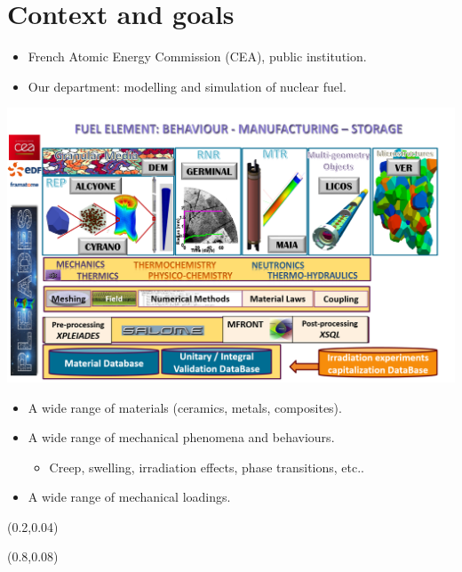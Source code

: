 \documentclass{beamer}
\begin{document}
\PageTitre{}

\begin{frame}[fragile]
  \begin{flushleft}
    {\tiny
      \tableofcontents[hideallsubsections]
    }
  \end{flushleft}
\end{frame}

\section{Context and goals}

\begin{frame}[fragile]
  \begin{itemize}
    \item French Atomic Energy Commission (CEA), public institution.
    \item Our department: modelling and simulation of nuclear fuel.
  \end{itemize}
  \begin{center}
    \includegraphics[trim = .2cm .2cm .2cm .6cm,clip,width=0.50\linewidth]{img/PLEIADES_2019_en.png}
  \end{center}
  \begin{itemize}
    \item A wide range of materials (ceramics, metals, composites).
    \item A wide range of mechanical phenomena and behaviours.
    \begin{itemize}
      \item Creep, swelling, irradiation effects, phase transitions, etc..
    \end{itemize}
    \item A wide range of mechanical loadings.
  \end{itemize}

\begin{textblock}{.40}(0.2,0.04)
\end{textblock}

\begin{textblock}{.40}(0.8,0.08)
\end{textblock}
\end{frame}
\end{document}
